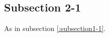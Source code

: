 \documentclass[../../main.tex]{subfiles}
\begin{document}
\subsection{Subsection 2-1}\label{subsection2-1}

As in subsection \ref{:subsection1-1}.
\end{document}
